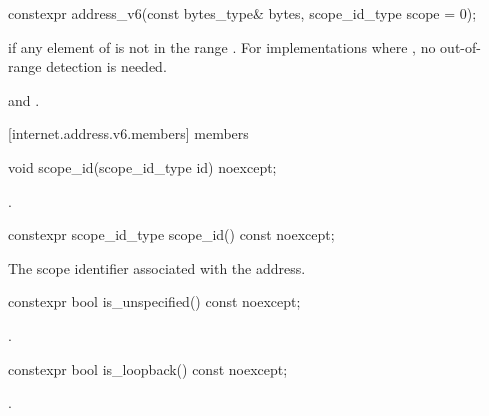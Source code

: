 \begin{itemdecl}
constexpr address_v6(const bytes_type& bytes,
                     scope_id_type scope = 0);
\end{itemdecl}

\begin{itemdescr}
\pnum
\remarks {} if any element of  is not in the range \tcode{[0, 0xFF]}. \enternote For implementations where , no out-of-range detection is needed. \exitnote

\pnum
\postconditions {} and .
\end{itemdescr}



[internet.address.v6.members]{ members}

%
\begin{itemdecl}
void scope_id(scope_id_type id) noexcept;
\end{itemdecl}

\begin{itemdescr}
\pnum
\postconditions {}.
\end{itemdescr}

\begin{itemdecl}
constexpr scope_id_type scope_id() const noexcept;
\end{itemdecl}

\begin{itemdescr}
\pnum
\returns The scope identifier associated with the address.
\end{itemdescr}

%
\begin{itemdecl}
constexpr bool is_unspecified() const noexcept;
\end{itemdecl}

\begin{itemdescr}
\pnum
\returns {}.
\end{itemdescr}

%
\begin{itemdecl}
constexpr bool is_loopback() const noexcept;
\end{itemdecl}

\begin{itemdescr}
\pnum
\returns {}.
\end{itemdescr}

